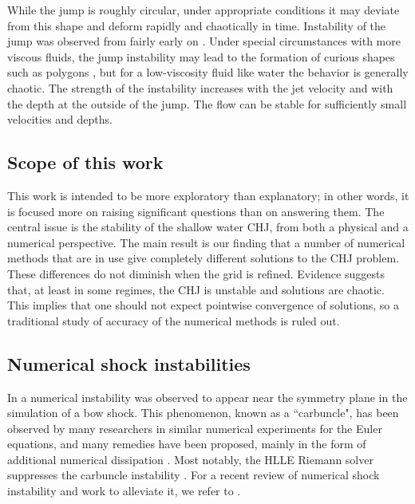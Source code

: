 \documentclass{article}
\begin{document}
While the jump is roughly circular, under appropriate conditions it may deviate
from this shape and deform rapidly and chaotically in time.
Instability of the jump was observed from fairly early on \cite{craik1981circular}.
Under special circumstances with more viscous fluids, the jump instability may lead to
the formation of curious shapes such as polygons \cite{ellegaard1998creating}, but
for a low-viscosity fluid like water the behavior is generally chaotic.
The strength of the instability increases with the jet velocity and with the
depth at the outside of the jump.  The flow can be stable for sufficiently small
velocities and depths.

\subsection{Scope of this work}
This work is intended to be more exploratory than explanatory; in other words,
it is focused more on raising significant questions than on answering them.
The central issue is the stability of the shallow water CHJ, from both a
physical and a numerical perspective.
The main result is our finding that a number of numerical methods that are
in use give completely different solutions to the CHJ problem.
These differences do not diminish when the grid is refined.
Evidence suggests that, at least in some regimes, the CHJ is unstable
and solutions are chaotic.  This implies that one should not expect pointwise
convergence of solutions, so a traditional study of accuracy of the numerical
methods is ruled out.

\subsection{Numerical shock instabilities}

In \cite{peery1988blunt} a numerical instability was observed to
appear near the symmetry plane in the simulation of a bow shock.
This phenomenon, known as a ``carbuncle", has been observed by many researchers
in similar numerical experiments for the Euler equations, and many remedies
have been proposed, mainly in the form of additional numerical dissipation
\cite{quirk1997contribution,pandolfi2001numerical,dumbser2004matrix,chauvat2005shock,ismail2009proposed,shen2014stability}.
Most notably, the HLLE Riemann solver suppresses the carbuncle instability \cite{quirk1997contribution}.
For a recent review of numerical shock instability and work to alleviate it,
we refer to \cite[Section 2.5]{simonnumerical}.
\end{document}
